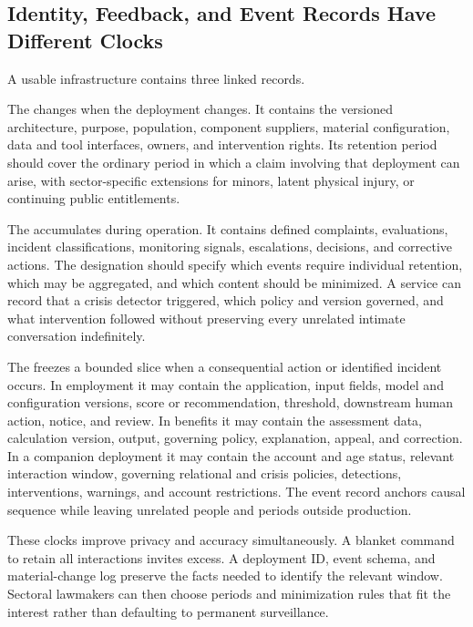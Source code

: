 \subsection{Identity, Feedback, and Event Records Have Different Clocks}

A usable infrastructure contains three linked records.

The  changes when the deployment changes. It contains the versioned architecture, purpose, population, component suppliers, material configuration, data and tool interfaces, owners, and intervention rights. Its retention period should cover the ordinary period in which a claim involving that deployment can arise, with sector-specific extensions for minors, latent physical injury, or continuing public entitlements.

The  accumulates during operation. It contains defined complaints, evaluations, incident classifications, monitoring signals, escalations, decisions, and corrective actions. The designation should specify which events require individual retention, which may be aggregated, and which content should be minimized. A service can record that a crisis detector triggered, which policy and version governed, and what intervention followed without preserving every unrelated intimate conversation indefinitely.

The  freezes a bounded slice when a consequential action or identified incident occurs. In employment it may contain the application, input fields, model and configuration versions, score or recommendation, threshold, downstream human action, notice, and review. In benefits it may contain the assessment data, calculation version, output, governing policy, explanation, appeal, and correction. In a companion deployment it may contain the account and age status, relevant interaction window, governing relational and crisis policies, detections, interventions, warnings, and account restrictions. The event record anchors causal sequence while leaving unrelated people and periods outside production.

These clocks improve privacy and accuracy simultaneously. A blanket command to retain all interactions invites excess. A deployment ID, event schema, and material-change log preserve the facts needed to identify the relevant window. Sectoral lawmakers can then choose periods and minimization rules that fit the interest rather than defaulting to permanent surveillance.

